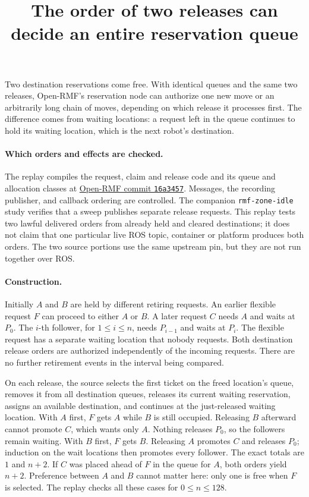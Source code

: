 \documentclass{article}
\title{The order of two releases can decide an entire reservation queue}
\begin{document}
\maketitle

Two destination reservations come free. With identical queues and the same two releases, Open-RMF's reservation node can authorize one new move or an arbitrarily long chain of moves, depending on which release it processes first. The difference comes from waiting locations: a request left in the queue continues to hold its waiting location, which is the next robot's destination.

\paragraph{Which orders and effects are checked.}
The replay compiles the request, claim and release code and its queue and allocation classes at \href{https://github.com/open-rmf/rmf_ros2/blob/16a3457196c6edf2f08a1ba4f497bf891404cbb7/rmf_reservation_node/src/main.cpp}{Open-RMF commit \texttt{16a3457}}. Messages, the recording publisher, and callback ordering are controlled. The companion \texttt{rmf-zone-idle} study verifies that a sweep publishes separate release requests. This replay tests two lawful delivered orders from already held and cleared destinations; it does not claim that one particular live ROS topic, container or platform produces both orders. The two source portions use the same upstream pin, but they are not run together over ROS.

\paragraph{Construction.}
Initially \(A\) and \(B\) are held by different retiring requests. An earlier flexible request \(F\) can proceed to either \(A\) or \(B\). A later request \(C\) needs \(A\) and waits at \(P_0\). The \(i\)-th follower, for \(1\le i\le n\), needs \(P_{i-1}\) and waits at \(P_i\). The flexible request has a separate waiting location that nobody requests. Both destination release orders are authorized independently of the incoming requests. There are no further retirement events in the interval being compared.

On each release, the source selects the first ticket on the freed location's queue, removes it from all destination queues, releases its current waiting reservation, assigns an available destination, and continues at the just-released waiting location. With \(A\) first, \(F\) gets \(A\) while \(B\) is still occupied. Releasing \(B\) afterward cannot promote \(C\), which wants only \(A\). Nothing releases \(P_0\), so the followers remain waiting. With \(B\) first, \(F\) gets \(B\). Releasing \(A\) promotes \(C\) and releases \(P_0\); induction on the wait locations then promotes every follower. The exact totals are \(1\) and \(n+2\). If \(C\) was placed ahead of \(F\) in the queue for \(A\), both orders yield \(n+2\). Preference between \(A\) and \(B\) cannot matter here: only one is free when \(F\) is selected. The replay checks all these cases for \(0\le n\le128\).
\end{document}
